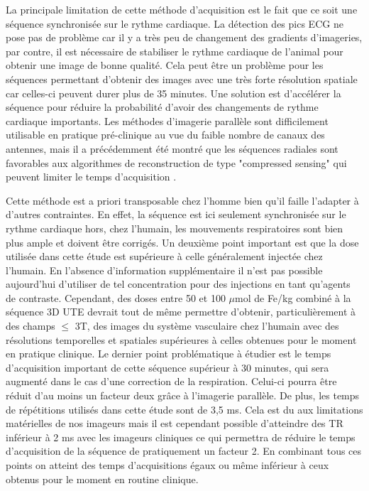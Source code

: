 La principale limitation de cette méthode d'acquisition est le fait que ce soit une séquence synchronisée sur le rythme cardiaque. La détection des pics ECG ne pose pas de problème car il y a très peu de changement des gradients d'imageries, par contre, il est nécessaire de stabiliser le rythme cardiaque de l'animal pour obtenir une image de bonne qualité. Cela peut être un problème pour les séquences permettant d'obtenir des images avec une très forte résolution spatiale car celles-ci peuvent durer plus de 35 minutes. Une solution est d'accélérer la séquence pour réduire la probabilité d'avoir des changements de rythme cardiaque importants. Les méthodes d'imagerie parallèle sont difficilement utilisable en pratique pré-clinique au vue du faible nombre de canaux des antennes, mais il a précédemment été montré que les séquences radiales sont favorables aux algorithmes de reconstruction de type "compressed sensing" qui peuvent limiter le temps d'acquisition \cite{Nam:2013nx}.
 
 
Cette méthode est a priori transposable chez l'homme bien qu'il faille l'adapter à d'autres contraintes. En effet, la séquence est ici seulement synchronisée sur le rythme cardiaque hors, chez l'humain, les mouvements respiratoires sont bien plus ample et doivent être corrigés.
Un deuxième point important est que la dose utilisée dans cette étude est supérieure à celle généralement injectée chez l'humain. En l'absence d'information supplémentaire il n'est pas possible aujourd'hui d'utiliser de tel concentration pour des injections en tant qu'agents de contraste. Cependant, des doses entre 50 et 100 $\mu$mol de Fe/kg combiné à la séquence 3D UTE devrait tout de même permettre d'obtenir, particulièrement à des champs $\leq$ 3T, des images du système vasculaire chez l'humain avec des résolutions temporelles et spatiales supérieures à celles obtenues pour le moment en pratique clinique. Le dernier point problématique à étudier est le temps d'acquisition important de cette séquence supérieur à 30 minutes, qui sera augmenté dans le cas d'une correction de la respiration. Celui-ci pourra être réduit d'au moins un facteur deux grâce à l'imagerie parallèle. De plus, les temps de répétitions utilisés dans cette étude sont de 3,5 ms. Cela est du aux limitations matérielles de nos imageurs mais il est cependant possible d'atteindre des TR inférieur à 2 ms avec les imageurs cliniques ce qui permettra de réduire le temps d'acquisition de la séquence de pratiquement un facteur 2. En combinant tous ces points on atteint des temps d'acquisitions égaux ou même inférieur à ceux obtenus pour le moment en routine clinique.









